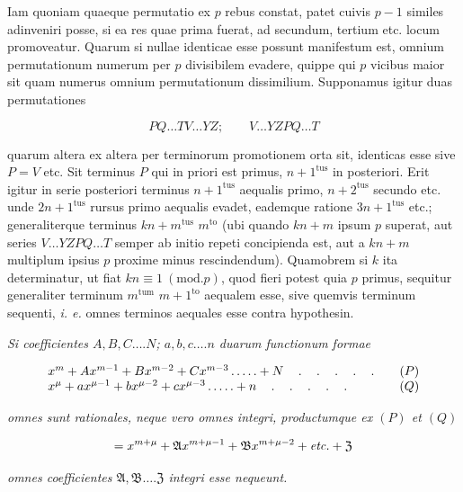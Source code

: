 
Iam quoniam quaeque permutatio ex $p$ rebus constat, patet cuivis $p-1$ similes adinveniri posse, si ea res quae prima fuerat, ad secundum, tertium etc. locum promoveatur. Quarum si nullae identicae esse possunt manifestum est, omnium permutationum numerum per $p$ divisibilem evadere, quippe qui $p$ vicibus maior sit quam numerus omnium permutationum dissimilium. Supponamus igitur duas permutationes

\[PQ\ldots TV\ldots YZ;\qquad V\ldots YZPQ\ldots T\]

\noindent quarum altera ex altera per terminorum promotionem orta sit, identicas esse sive $P=V$ etc. Sit terminus $P$ qui in priori est primus, $n+1^{\mathrm{tus}}$ in posteriori. Erit igitur in serie posteriori terminus $n+1^{\mathrm{tus}}$ aequalis primo, $n+2^{\mathrm{tus}}$ secundo etc. unde $2n+1^{\mathrm{tus}}$ rursus primo aequalis evadet, eademque ratione $3n+1^{\mathrm{tus}}$ etc.; generaliterque terminus $kn+m^{\mathrm{tus}}$ $m^{\mathrm{to}}$ (ubi quando $kn+m$ ipsum $p$ superat, aut series $V\ldots YZPQ\ldots T$ semper ab initio repeti concipienda est, aut a $kn+m$ multiplum ipsius $p$ proxime minus rescindendum). Quamobrem si $k$ ita determinatur, ut fiat $kn\equiv1\ (\mathrm{mod.}p)$, quod fieri potest quia $p$ primus, sequitur generaliter terminum $m^{\mathrm{tum}}$ $m+1^{\mathrm{to}}$ aequalem esse, sive quemvis terminum sequenti, \emph{i. e.} omnes terminos aequales esse contra hypothesin.


\emph{Si coefficientes $A,B,C\ldots.N$; $a,b,c\ldots.n$ duarum functionum formae}

\[
\begin{array}{l@{\qquad}c}
x^m+Ax^{m-1}+Bx^{m-2}+Cx^{m-3}\mathinner{\ldotp\ldotp\ldotp\ldotp\ldotp}+N
\quad\mathinner{\ldotp\quad\ldotp\quad\ldotp\quad\ldotp\quad\ldotp}&(P)\\
x^\mu+ax^{\mu-1}+bx^{\mu-2}+cx^{\mu-3}\mathinner{\ldotp\ldotp\ldotp\ldotp\ldotp}+n
\quad\mathinner{\ldotp\quad\ldotp\quad\ldotp\quad\ldotp\quad\ldotp}&(Q)
\end{array}
\]

\noindent\emph{omnes sunt rationales, neque vero omnes integri, productumque ex $(P)$ et $(Q)$}

\[=x^{m+\mu}+\mathfrak{A}x^{m+\mu-1}+\mathfrak{B}x^{m+\mu-2}+\emph{etc.}+\mathfrak{Z}\]

\noindent\emph{omnes coefficientes $\mathfrak{A},\mathfrak{B}\ldots.\mathfrak{Z}$ integri esse nequeunt.}

